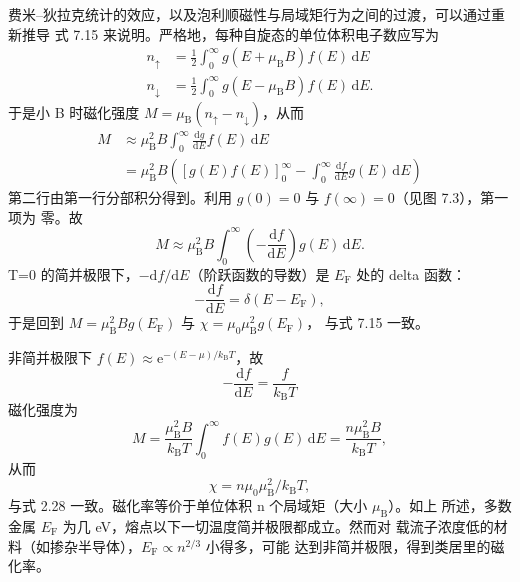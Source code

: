 费米--狄拉克统计的效应，以及泡利顺磁性与局域矩行为之间的过渡，可以通过重新推导
式 7.15 来说明。严格地，每种自旋态的单位体积电子数应写为
\begin{equation*}
\begin{aligned}
n_{\uparrow} &= \frac{1}{2}\int_{0}^{\infty}g(E+\mu_{\mathrm{B}}B)f(E)\,\mathrm{d}E\\
n_{\downarrow} &= \frac{1}{2}\int_{0}^{\infty}g(E-\mu_{\mathrm{B}}B)f(E)\,\mathrm{d}E.
\end{aligned}\tag{7.17}
\end{equation*}
于是小 B 时磁化强度 $M=\mu_{\mathrm{B}}(n_{\uparrow}-n_{\downarrow})$，从而
\begin{align*}
M &\approx \mu_{\mathrm{B}}^{2}B\int_{0}^{\infty}\frac{\mathrm{d}g}{\mathrm{d}E}f(E)\,\mathrm{d}E\\
&= \mu_{\mathrm{B}}^{2}B\left(\left[g(E)f(E)\right]_{0}^{\infty} - \int_{0}^{\infty}\frac{\mathrm{d}f}{\mathrm{d}E}g(E)\,\mathrm{d}E\right)\tag{7.18}
\end{align*}
第二行由第一行分部积分得到。利用 $g(0)=0$ 与 $f(\infty)=0$（见图 7.3），第一项为
零。故
\begin{equation*}
M \approx \mu_{\mathrm{B}}^{2}B\int_{0}^{\infty}\left(-\frac{\mathrm{d}f}{\mathrm{d}E}\right)g(E)\,\mathrm{d}E.\tag{7.19}
\end{equation*}
T=0 的简并极限下，$-\mathrm{d}f/\mathrm{d}E$（阶跃函数的导数）是 $E_{\mathrm{F}}$
处的 delta 函数：
\begin{equation*}
-\frac{\mathrm{d}f}{\mathrm{d}E} = \delta(E-E_{\mathrm{F}}),\tag{7.20}
\end{equation*}
于是回到 $M=\mu_{\mathrm{B}}^{2}Bg(E_{\mathrm{F}})$ 与 $\chi=\mu_0\mu_{\mathrm{B}}^{2}g(E_{\mathrm{F}})$，
与式 7.15 一致。

非简并极限下 $f(E)\approx\mathrm{e}^{-(E-\mu)/k_{\mathrm{B}}T}$，故
\begin{equation*}
-\frac{\mathrm{d}f}{\mathrm{d}E} = \frac{f}{k_{\mathrm{B}}T}\tag{7.21}
\end{equation*}
磁化强度为
\begin{equation*}
M = \frac{\mu_{\mathrm{B}}^{2}B}{k_{\mathrm{B}}T}\int_{0}^{\infty}f(E)g(E)\,\mathrm{d}E = \frac{n\mu_{\mathrm{B}}^{2}B}{k_{\mathrm{B}}T},\tag{7.22}
\end{equation*}
从而
\begin{equation*}
\chi = n\mu_0\mu_{\mathrm{B}}^{2}/k_{\mathrm{B}}T,\tag{7.23}
\end{equation*}
与式 2.28 一致。磁化率等价于单位体积 n 个局域矩（大小 $\mu_{\mathrm{B}}$）。如上
所述，多数金属 $E_{\mathrm{F}}$ 为几 eV，熔点以下一切温度简并极限都成立。然而对
载流子浓度低的材料（如掺杂半导体），$E_{\mathrm{F}}\propto n^{2/3}$ 小得多，可能
达到非简并极限，得到类居里的磁化率。

